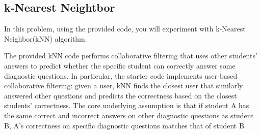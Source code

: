 \subsection*{k-Nearest Neightbor}
In this problem, using the provided code, you will experiment with k-Nearest Neighbor(kNN) algorithm.

The provided kNN code performs collaborative filtering that uses other students' answers to predict whether the specific student can correctly answer some diagnostic questions. In particular, the starter code implements user-based collaborative filtering: given a user, kNN finds the closest user that similarly answered other questions and predicts the correctness based on the closest students' correctness. The core underlying assumption is that if student A has the same correct and incorrect answers on other diagnostic questions as student B, A's correctness on specific diagnostic questions matches that of student B.
